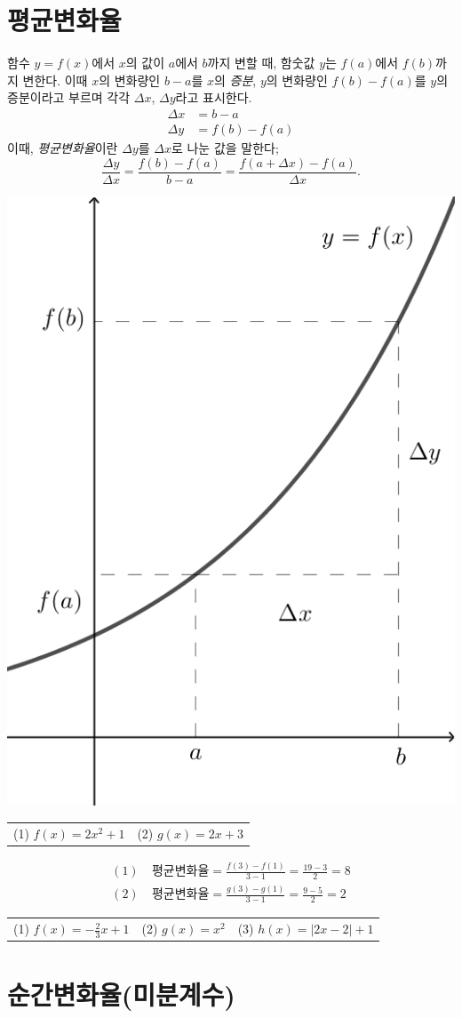 \documentclass{oblivoir}
\begin{document}
%
\bigskip

\clearpage
\section{평균변화율}
함수 \(y=f(x)\)에서 \(x\)의 값이 \(a\)에서 \(b\)까지 변할 때, 함숫값 \(y\)는 \(f(a)\)에서 \(f(b)\)까지 변한다.
이때 \(x\)의 변화량인 \(b-a\)를 \(x\)의 \emph{증분}, \(y\)의 변화량인 \(f(b)-f(a)\)를 \(y\)의 증분이라고 부르며 각각 \(\Delta x\), \(\Delta y\)라고 표시한다.
\begin{align*}
\Delta x &= b-a\\
\Delta y &= f(b)-f(a)
\end{align*}
이때, \emph{평균변화율}이란 \(\Delta y\)를 \(\Delta x\)로 나눈 값을 말한다;
\[\frac{\Delta y}{\Delta x}=\frac{f(b)-f(a)}{b-a}=\frac{f(a+\Delta x)-f(a)}{\Delta x}.\]

\begin{center}
\includegraphics[width=.4\textwidth]{average_rate}
\end{center}

\vspace{-15pt}
%
\begin{tabularx}{\textwidth}{XX}
(1) \(f(x)=2x^2+1\)
&
(2) \(g(x)=2x+3\)
\end{tabularx}
\vspace{-15pt}
\begin{mdframed}
\vspace{-20pt}
\begin{align*}
(1)&\:\text{평균변화율}=\frac{f(3)-f(1)}{3-1}=\frac{19-3}2=8\\
(2)&\:\text{평균변화율}=\frac{g(3)-g(1)}{3-1}=\frac{9-5}2=2
\end{align*}
\end{mdframed}

%
\begin{tabularx}{\textwidth}{XXX}
(1) \(f(x)=-\frac23x+1\)
&
(2) \(g(x)=x^2\)
&
(3) \(h(x)=|2x-2|+1\)
\end{tabularx}

\section{순간변화율(미분계수)}
\end{document}
